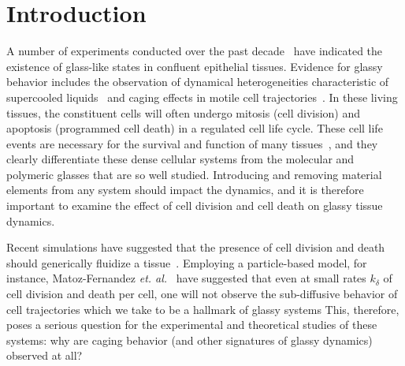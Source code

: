 \documentclass[
reprint
,aps
,amssymb
,amsmath
,superscriptaddress
]{revtex4-1}
\begin{document}
\maketitle

\section{Introduction}
A number of experiments conducted over the past decade~\cite{Angelini2011,Schotz2013,Park2015} have indicated the existence of glass-like states in confluent epithelial tissues. Evidence for glassy behavior includes the observation of dynamical heterogeneities  characteristic of supercooled liquids~\cite{Angelini2011} and caging effects in motile cell trajectories~\cite{Park2015}. In these living tissues, the constituent cells will often undergo mitosis (cell division) and apoptosis (programmed cell death) in a regulated cell life cycle. These cell life events are necessary for the survival and function of many tissues~\cite{Renehan2001,Thompson1995}, and they clearly differentiate these dense cellular systems from the molecular and polymeric glasses that are so well studied. Introducing and removing material elements from any system should impact the dynamics, and it is therefore important to examine the effect of cell division and cell death on  glassy tissue dynamics.

Recent simulations have suggested that the presence of cell division and death should generically fluidize a tissue~\cite{Matoz-Fernandez2017-1,Matoz-Fernandez2017-2, Ranft2010,Malmi-Kakkada2018}. Employing a particle-based model, for instance, Matoz-Fernandez \textit{et. al.}~\cite{Matoz-Fernandez2017-1} have suggested that even at small rates $k_\delta$ of cell division and death per cell, one will not observe the sub-diffusive behavior of cell trajectories which we take to be a hallmark of glassy systems This, therefore, poses a serious question for the experimental and theoretical studies of these systems: why are caging behavior (and other signatures of glassy dynamics) observed at all? 
\end{document}
